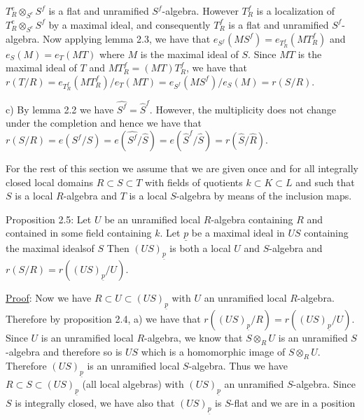 $T_R^e\otimes_{S^e}S^f$ is a flat and unramified $S^f$-algebra. However $T_R^f$ is a localization
of $T_R^e\otimes_{S^e}S^f$ by a maximal ideal, and consequently $T_R^f$ is a flat and
unramified $S^f$-algebra. Now applying lemma 2.3, we have that $e_{S^f}(MS^f)=
e_{T_R^f}(MT_R^f)$ and $e_S(M)=e_T(MT)$ where $M$ is the maximal ideal of $S$. Since $MT$
is the maximal ideal of $T$ and $MT_R^f=(MT)T_R^f$, we have that $r(T/R)=e_{T_R^f}(MT_R^f)/e_T(MT)
=e_{S^f}(MS^f)/e_S(M)=r(S/R)$.

c) By lemma 2.2 we have $\widehat{S^f}=\widehat S^f$. However, the multiplicity does not
change under the completion and hence we have that $r(S/R)=e(S^f/S)=
e(\widehat{S^f}/\widehat S)=e(\widehat S^f/\widehat S)=r(\widehat S/\widehat R)$.

For the rest of this section we assume that we are given once and for
all integrally closed local domains $R\subset S\subset T$ with fields of quotients
$k\subset K\subset L$ and such that $S$ is a local $R$-algebra and $T$ is a local $S$-algebra
by means of the inclusion maps.

Proposition 2.5: Let $U$ be an unramified local $R$-algebra containing $R$
and contained in some field containing $k$. Let $\underline p$ be a maximal ideal in $US$
containing the maximal idealsof $S$ Then $(US)_{\underline p}$ is both a local $U$ and
$S$-algebra and $r(S/R)=r((US)_{\underline p}/U)$.

\uline{Proof}: Now we have $R\subset U\subset(US)_{\underline p}$ with $U$ an unramified local $R$-algebra.
Therefore by proposition 2.4, a) we have that $r((US)_{\underline p}/R)=r((US)_{\underline p}/U)$. Since
$U$ is an unramified local $R$-algebra, we know that $S\otimes_R U$ is an unramified
$S$-algebra and therefore so is $US$ which is a homomorphic image of $S\otimes_R U$.
Therefore $(US)_{\underline p}$ is an unramified local $S$-algebra. Thus we have $R\subset S\subset(US)_{\underline p}$
(all local algebras) with $(US)_{\underline p}$ an unramified $S$-algebra. Since $S$ is
integrally closed, we have also that $(US)_{\underline p}$ is $S$-flat and we are in a position
